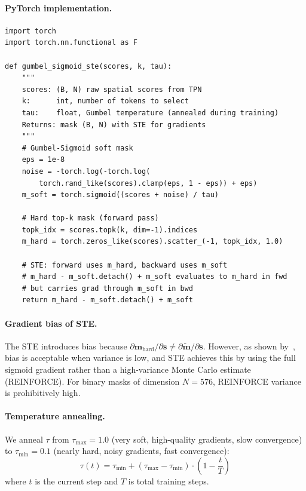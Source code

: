 \documentclass[12pt,a4paper]{article}
\newcommand{\vm}{\mathbf{m}}     %
\newcommand{\vs}{\mathbf{s}}     %
\begin{document}
\paragraph{PyTorch implementation.}

\begin{lstlisting}[caption={Gumbel-Sigmoid STE for top-$k$ selection.}]
import torch
import torch.nn.functional as F

def gumbel_sigmoid_ste(scores, k, tau):
    """
    scores: (B, N) raw spatial scores from TPN
    k:      int, number of tokens to select
    tau:    float, Gumbel temperature (annealed during training)
    Returns: mask (B, N) with STE for gradients
    """
    # Gumbel-Sigmoid soft mask
    eps = 1e-8
    noise = -torch.log(-torch.log(
        torch.rand_like(scores).clamp(eps, 1 - eps)) + eps)
    m_soft = torch.sigmoid((scores + noise) / tau)

    # Hard top-k mask (forward pass)
    topk_idx = scores.topk(k, dim=-1).indices
    m_hard = torch.zeros_like(scores).scatter_(-1, topk_idx, 1.0)

    # STE: forward uses m_hard, backward uses m_soft
    # m_hard - m_soft.detach() + m_soft evaluates to m_hard in fwd
    # but carries grad through m_soft in bwd
    return m_hard - m_soft.detach() + m_soft
\end{lstlisting}

\paragraph{Gradient bias of STE.}
The STE introduces bias because $\partial \vm_{\mathrm{hard}} / \partial \vs \neq
\partial \tilde{\vm} / \partial \vs$. However, as shown by~\citet{bengio2013estimating},
bias is acceptable when variance is low, and STE achieves this by using the full
sigmoid gradient rather than a high-variance Monte Carlo estimate (REINFORCE).
For binary masks of dimension $N = 576$, REINFORCE variance is prohibitively high.

\paragraph{Temperature annealing.}
We anneal $\tau$ from $\tau_{\max} = 1.0$ (very soft, high-quality gradients,
slow convergence) to $\tau_{\min} = 0.1$ (nearly hard, noisy gradients, fast
convergence):
\begin{equation}
  \tau(t) = \tau_{\min} + (\tau_{\max} - \tau_{\min})
    \cdot \left(1 - \frac{t}{T}\right)
  \label{eq:tau_anneal}
\end{equation}
where $t$ is the current step and $T$ is total training steps.
\end{document}
